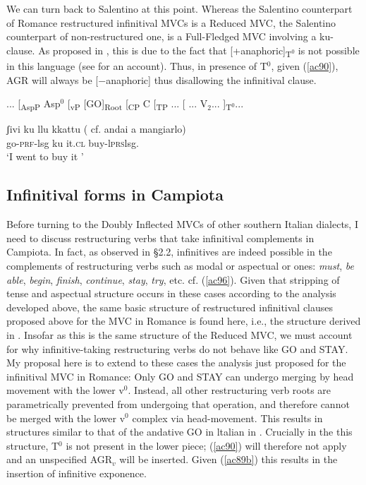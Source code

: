 \documentclass[output=paper]{langscibook}
\begin{document}
We can turn back to Salentino at this point. Whereas the Salentino counterpart of Romance restructured infinitival MVCs is a Reduced MVC, the Salentino counterpart of non-restructured one, is a Full-Fledged MVC involving a ku-clause.  As proposed in \citet{calabrese1993a}, this is due to the fact that [+anaphoric]\textsubscript{T$^0$} is not possible in this language (see \citealt{calabrese1993a} for an account).  Thus, in presence of T$^0$, given (\ref{ac90}), AGR will always be [−anaphoric] thus disallowing the infinitival clause.

\ea\label{ac94}
 ... [\textsubscript{AspP} Asp$^0$ [\textsubscript{vP} [GO]\textsubscript{Root} [\textsubscript{CP} C [\textsubscript{TP} ... [ ... V$_2$... ]\textsubscript{T$^0$}...
\z

\ea \label{ac95} \gll  ʃivi  ku  llu kkattu ( cf. andai a mangiarlo)\\
  go-\textsc{prf}-lsg  ku  it.\textsc{cl} buy-l\textsc{prs}lsg. \\
 \glt ‘I went to buy it '
\z

\subsection{Infinitival forms in Campiota}

Before turning to the Doubly Inflected MVCs of other southern Italian dialects, I need to discuss restructuring verbs that take infinitival complements in Campiota. In fact, as observed in §2.2, infinitives are indeed possible in the complements of restructuring verbs such as modal or aspectual or ones: \textit{must},\textit{ be  able},  \textit{begin},  \textit{finish},  \textit{continue},  \textit{stay},  \textit{try}, etc. cf. (\ref{ac96}). Given that stripping of tense and aspectual structure occurs in these cases according to the analysis developed above, the same basic structure of restructured infinitival clauses proposed above for the MVC in Romance is found here, i.e., the structure derived in . Insofar as this is the same structure of the Reduced MVC, we must account for why infinitive-taking restructuring verbs do not behave like GO and STAY. My proposal here is to extend to these cases the analysis just proposed for the infinitival MVC in Romance: Only GO and STAY can undergo merging  by  head  movement  with  the  lower  v$^0$.  Instead, all other restructuring verb roots are parametrically prevented from undergoing that operation, and therefore cannot be merged with the lower v$^0$ complex via head-movement. This results in structures similar to that of the andative GO in ltalian in . Crucially in the this structure, T$^0$ is not present in the lower piece; (\ref{ac90}) will therefore not apply and an unspecified AGR$_v$ will be inserted.  Given (\ref{ac89b}) this results in the insertion of infinitive exponence.
\end{document}
